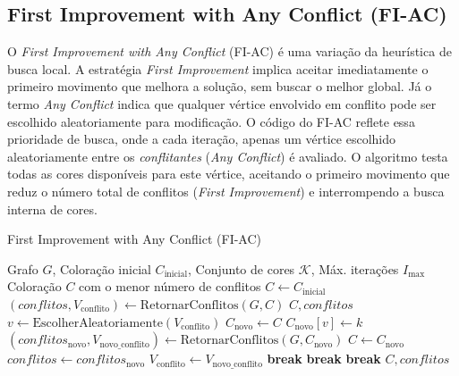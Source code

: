 \documentclass[12pt,a4paper]{article}
\begin{document}
\subsection{First Improvement with Any Conflict (FI-AC)}
O \textit{First Improvement with Any Conflict} (FI-AC) é uma variação da heurística de busca local. A estratégia \textit{First Improvement} implica aceitar imediatamente o primeiro movimento que melhora a solução, sem buscar o melhor global. Já o termo \textit{Any Conflict} indica que qualquer vértice envolvido em conflito pode ser escolhido aleatoriamente para modificação.
O código do FI-AC reflete essa prioridade de busca, onde a cada iteração, apenas um vértice escolhido aleatoriamente entre os \textit{conflitantes} (\textit{Any Conflict}) é avaliado. O algoritmo testa todas as cores disponíveis para este vértice, aceitando o primeiro movimento que reduz o número total de conflitos (\textit{First Improvement}) e interrompendo a busca interna de cores.
\begin{algorithm}[H]
\caption{First Improvement with Any Conflict (FI-AC)}
\label{alg:fi_ac}
\begin{algorithmic}[1]
\Require Grafo \(G\), Coloração inicial \(C_{\text{inicial}}\), Conjunto de cores \(\mathcal{K}\), Máx. iterações \(I_{\max}\)
\Ensure Coloração \(C\) com o menor número de conflitos
\State \(C \gets C_{\text{inicial}}\)
\State \((conflitos, V_{\text{conflito}}) \gets \text{RetornarConflitos}(G, C)\)
 \State \Return \(C, conflitos\) \EndIf
{}
    \State \(v \gets \text{EscolherAleatoriamente}(V_{\text{conflito}})\)
        \State \(C_{\text{novo}} \gets C\)
        \State \(C_{\text{novo}}[v] \gets k\)
        \State \((conflitos_{\text{novo}}, V_{\text{novo\_conflito}}) \gets \text{RetornarConflitos}(G, C_{\text{novo}})\)
            \State \(C \gets C_{\text{novo}}\)
            \State \(conflitos \gets conflitos_{\text{novo}}\)
            \State \(V_{\text{conflito}} \gets V_{\text{novo\_conflito}}\)
             \State \textbf{break}  \EndIf
            \State \textbf{break} 
        \EndIf
    \EndFor
     \State \textbf{break} \EndIf
\EndFor
\State \Return \(C, conflitos\)
\end{algorithmic}
\end{algorithm}
\end{document}
